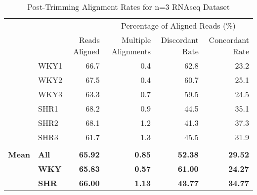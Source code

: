 \begin{table}[h!]
\scriptsize
\begin{tabular}{llrrrr}
        &      &                     & \multicolumn{3}{c}{Percentage of Aligned Reads (\%)}        \\
        &      & Reads Aligned & Multiple Alignments & Discordant Rate & Concordant Rate \\
         \hline
        & WKY1 & 66.7                & 0.4                     & 62.8            & 23.2            \\
        & WKY2 & 67.5                & 0.4                     & 60.7            & 25.1            \\
        & WKY3 & 63.3                & 0.7                     & 59.5            & 24.5            \\
        & SHR1 & 68.2                & 0.9                     & 44.5            & 35.1            \\
        & SHR2 & 68.1                & 1.2                     & 41.3            & 37.3            \\
        & SHR3 & 61.7                & 1.3                     & 45.5            & 31.9            \\
        &      &                     &                         &                 &                 \\
\textbf{Mean} & \textbf{All}  & \textbf{65.92}               & \textbf{0.85}                    & \textbf{52.38}           & \textbf{29.52}           \\
        & \textbf{WKY}  & \textbf{65.83}               & \textbf{0.57}                    & \textbf{61.00}          & \textbf{24.27}           \\
        & \textbf{SHR}  & \textbf{66.00}               & \textbf{1.13}                    & \textbf{43.77}           & \textbf{34.77}          
\end{tabular}
\caption{Post-Trimming Alignment Rates for n=3 RNAseq Dataset}
\label{fig:n_3_alignmentrates}	
\end{table}


